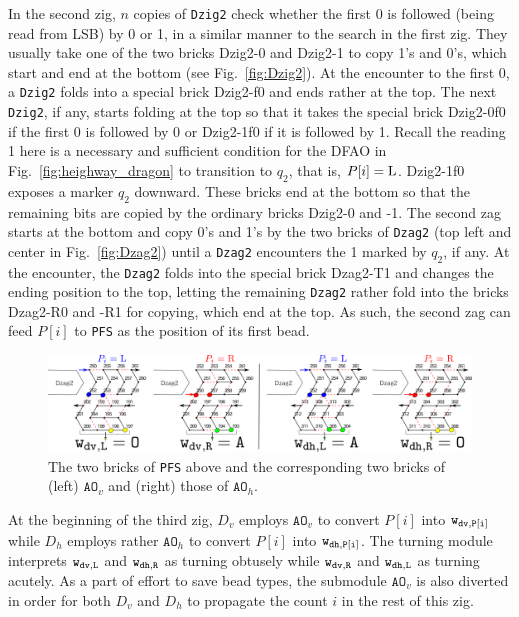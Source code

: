 \documentclass[runningheads]{llncs}
\begin{document}
In the second zig, $n$ copies of \texttt{Dzig2} check whether the first 0 is followed (being read from LSB) by 0 or 1, in a similar manner to the search in the first zig. 
They usually take one of the two bricks Dzig2-0 and Dzig2-1 to copy 1's and 0's, which start and end at the bottom (see Fig.~\ref{fig:Dzig2}).
At the encounter to the first 0, a \texttt{Dzig2} folds into a special brick Dzig2-f0 and ends rather at the top. 
The next \texttt{Dzig2}, if any, starts folding at the top so that it takes the special brick Dzig2-0f0 if the first 0 is followed by 0 or Dzig2-1f0 if it is followed by 1. 
Recall the reading 1 here is a necessary and sufficient condition for the DFAO in Fig.~\ref{fig:heighway_dragon} to transition to $q_2$, that is, $P[i] = {\rm L}$. 
Dzig2-1f0 exposes a marker $q_2$ downward. 
These bricks end at the bottom so that the remaining bits are copied by the ordinary bricks Dzig2-0 and -1. 
The second zag starts at the bottom and copy 0's and 1's by the two bricks of \texttt{Dzag2} (top left and center in Fig.~\ref{fig:Dzag2}) until a \texttt{Dzag2} encounters the 1 marked by $q_2$, if any. 
At the encounter, the \texttt{Dzag2} folds into the special brick Dzag2-T1 and changes the ending position to the top, letting the remaining \texttt{Dzag2} rather fold into the bricks Dzag2-R0 and -R1 for copying, which end at the top. 
As such, the second zag can feed $P[i]$ to \texttt{PFS} as the position of its first bead. 

\begin{figure}[tb]
\centering
\includegraphics[width=\linewidth]{Figs/PFS.png}
\caption{The two bricks of \texttt{PFS} above and the corresponding two bricks of (left) $\mathtt{AO}_v$ and (right) those of $\mathtt{AO}_h$.}
\label{fig:PFS}
\end{figure}


At the beginning of the third zig, $D_v$ employs $\mathtt{AO}_v$ to convert $P[i]$ into ${\tt w_{dv, P[i]}}$ while $D_h$ employs rather $\mathtt{AO}_h$ to convert $P[i]$ into ${\tt w_{dh, P[i]}}$. 
The turning module interprets ${\tt w_{dv, L}}$ and ${\tt w_{dh, R}}$ as turning obtusely while ${\tt w_{dv, R}}$ and ${\tt w_{dh, L}}$ as turning acutely. 
As a part of effort to save bead types, the submodule $\mathtt{AO}_v$ is also diverted in order for both $D_v$ and $D_h$ to propagate the count $i$ in the rest of this zig. 
\end{document}
